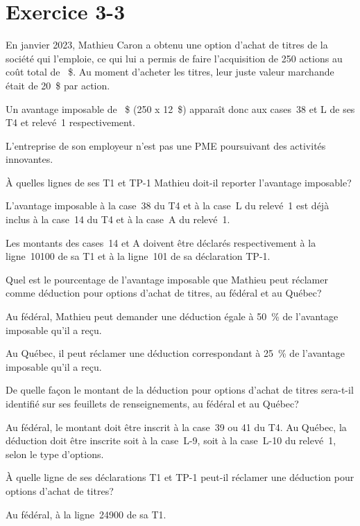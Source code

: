 \section{Exercice 3-3}
\setcounter{question}{0}
\begin{question}
	En janvier 2023, Mathieu Caron a obtenu une option d'achat de titres de la société qui l'emploie, ce qui lui a permis de faire l'acquisition de 250 actions au coût total de ~\$. Au moment d'acheter les titres, leur juste valeur marchande était de 20~\$ par action. 
	
	Un avantage imposable de ~\$ (250 x 12~\$) apparaît donc aux cases~38 et L de ses T4 et relevé~1 respectivement. 
	
	L'entreprise de son employeur n'est pas une PME poursuivant des activités innovantes. 
\end{question}
\setcounter{sousQuestion}{0}
\begin{sousQuestion}
	À quelles lignes de ses T1 et TP-1 Mathieu doit-il reporter l'avantage imposable?
\end{sousQuestion}
L'avantage imposable à la case~38 du T4 et à la case~L du relevé~1 est déjà inclus à la case~14 du T4 et à la case~A du relevé~1.

Les montants des cases~14 et A doivent être déclarés respectivement à la ligne~10100 de sa T1 et à la ligne~101 de sa déclaration TP-1.

\begin{sousQuestion}
	Quel est le pourcentage de l'avantage imposable que Mathieu peut réclamer comme déduction pour options d'achat de titres, au fédéral et au Québec?
\end{sousQuestion}
Au fédéral, Mathieu peut demander une déduction égale à 50~\% de l'avantage imposable qu'il a reçu.

Au Québec, il peut réclamer une déduction correspondant à 25~\% de l'avantage imposable qu'il a reçu.

\begin{sousQuestion}
	De quelle façon le montant de la déduction pour options d'achat de titres sera-t-il identifié sur ses feuillets de renseignements, au fédéral et au Québec?
\end{sousQuestion}
Au fédéral, le montant doit être inscrit à la case~39 ou 41 du T4. Au Québec, la déduction doit être inscrite soit à la case~L-9, soit à la case~L-10 du relevé~1, selon le type d'options. 

\begin{sousQuestion}
	À quelle ligne de ses déclarations T1 et TP-1 peut-il réclamer une déduction pour options d'achat de titres?
\end{sousQuestion}
Au fédéral, à la ligne~24900 de sa T1.

